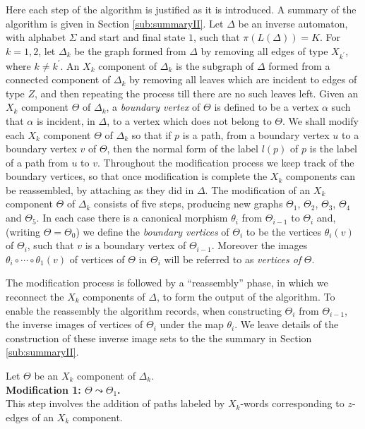 \documentclass[a4paper,12pt]{article}
\renewcommand{\a}{\alpha }
\newcommand{\D}{\Delta }
\newcommand{\T}{\Theta }
\renewcommand{\S}{\Sigma }
\numberwithin{equation}{section}
\numberwithin{figure}{section}
\begin{document}
Here each step of the algorithm is justified as it is introduced. A 
summary of the algorithm is given in Section \ref{sub:summaryII}.  
Let $\D$ be an inverse automaton, with alphabet $\S$ and
start and final state $1$, such that
$\pi(L(\D))=K$.
For $k=1,2$, let $\D_k$ be the graph formed from $\D$ by removing all edges of
type $X_{k^\prime}$, where $k\neq k^\prime$. An $X_k$ component of
$\D_k$ is the subgraph of $\D$ formed from a connected component
of $\D_k$ by removing all leaves which are incident to edges of
type $Z$, and then repeating the process till there are no such
leaves left. Given an $X_k$ component $\T$ of $\D_k$,  a
{\em boundary vertex} of $\T$ is defined to be a vertex
$\a$ such that $\a$ is incident, in $\D$, to a vertex which does not
belong to $\T$.
 We shall modify each  $X_k$ component $\T$ of $\D_k$ so that if $p$ is a path,
from a  boundary vertex $u$  to a boundary vertex $v$ of $\T$,
then the normal form  of  the label $l(p)$ of $p$ is the label of
a path from $u$ to $v$. Throughout the modification process we
keep track of the boundary vertices, so that once modification is
complete the $X_k$ components can be reassembled, by attaching as
they did in $\D$. The modification of an $X_k$ component $\Theta$
of $\D_k$ consists of
five steps, producing new graphs $\T_1$, $\T_2$, $\T_3$, $\T_4$
and $\T_5$. In each case there is a canonical morphism $\theta_i$
from $\T_{i-1}$ to $\T_i$ and,
 (writing $\T=\T_0$)
we define the {\em boundary vertices} of $\T_{i}$ to be the vertices $\theta_{i}(v)$
of $\T_i$, such that $v$ is a boundary vertex of $\T_{i-1}$. Moreover the
 images $\theta_i\circ \cdots\circ \theta_1(v)$ of vertices of $\T$ in $\T_i$
will be referred to as  {\em vertices of} $\T$.


The modification process is followed by a ``reassembly'' phase, in which
we reconnect the $X_k$ components of $\D$, 
to form the output of the algorithm. 
To enable the reassembly the algorithm records, when constructing 
$\Theta_{i}$ from $\Theta_{i-1}$, the inverse images of vertices of 
$\Theta_{i}$ under the map $\theta_i$. We leave details of the
construction of these inverse image sets to the the summary
in 
Section \ref{sub:summaryII}. 
 
Let $\T$ be an $X_k$ component of $\D_k$.
\\[1em]

\noindent\textbf{Modification 1: $\T\leadsto \T_1$.}\\
This step involves the addition of paths labeled by $X_k$-words corresponding to
$z$-edges of an $X_k$ component.
\end{document}
